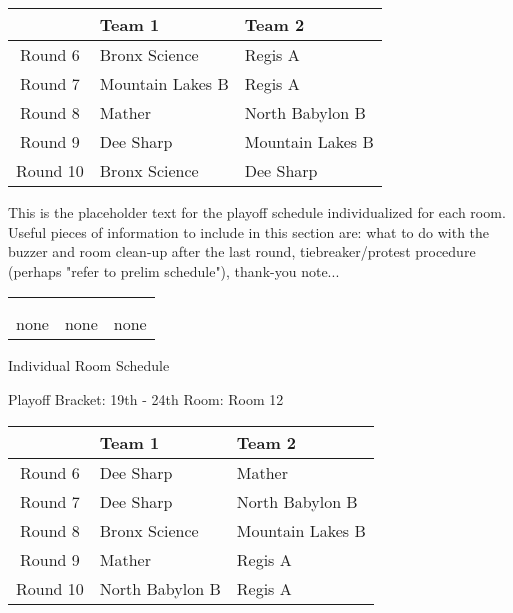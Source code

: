 \documentclass{article}%
\begin{document}
%
\begin{tabularx}{\textwidth}{|c|Y|Y|}%
\hline%
&Team 1&Team 2\\%
\hline%
Round 6&Bronx Science&Regis A\\%
Round 7&Mountain Lakes B&Regis A\\%
Round 8&Mather&North Babylon B\\%
Round 9&Dee Sharp&Mountain Lakes B\\%
Round 10&Bronx Science&Dee Sharp\\%
\hline%
\end{tabularx}%
\vspace*{16pt}%
\linebreak%
This is the placeholder text for the playoff schedule individualized for each room. Useful pieces of information to include in this section are: what to do with the buzzer and room clean{-}up after the last round, tiebreaker/protest procedure (perhaps "refer to prelim schedule"), thank{-}you note...%
\vspace*{30pt}%
\newline%
%
\begin{tabularx}{\textwidth}{YYY}%
  &  &  \\%
\\%
none&none&none\\%
\end{tabularx}%
\newpage%
\begin{center}%
\begin{Huge}%
Individual Room Schedule%
\end{Huge}%
\vspace*{16pt}%
\linebreak%
\begin{Large}%
Playoff Bracket: 19th - 24th \hfill Room: Room 12%
\end{Large}%
\end{center}%
%
\begin{tabularx}{\textwidth}{|c|Y|Y|}%
\hline%
&Team 1&Team 2\\%
\hline%
Round 6&Dee Sharp&Mather\\%
Round 7&Dee Sharp&North Babylon B\\%
Round 8&Bronx Science&Mountain Lakes B\\%
Round 9&Mather&Regis A\\%
Round 10&North Babylon B&Regis A\\%
\hline%
\end{tabularx}%
\end{document}
